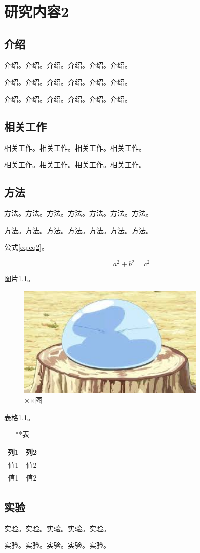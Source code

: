 \chapter{研究内容2}
\thispagestyle{mainstyle} %
\section{介绍}
介绍。介绍。介绍。介绍。介绍。介绍。

介绍。介绍。介绍。介绍。介绍。介绍。

介绍。介绍。介绍。介绍。介绍。介绍。

\section{相关工作}
相关工作。相关工作。相关工作。相关工作。

相关工作。相关工作。相关工作。相关工作。

\section{方法}
方法。方法。方法。方法。方法。方法。方法。

方法。方法。方法。方法。方法。方法。方法。

公式\ref{eq:eq2}。

\begin{equation}
    a^2 + b^2 = c^2 \label{eq:eq2}
\end{equation}

图片\ref{fig:image2}。
\begin{figure}
    \centering
    \includegraphics[width=0.8\textwidth]{images/image.jpeg}
    \caption{××图}
    \label{fig:image2}
\end{figure}

表格\ref{tab:table2}。
\begin{table}
    \centering
    \caption{**表}
    \label{tab:table2}
    \begin{tabular}{c|c}
        \toprule[1.5bp]
        列1 & 列2 \\
        \midrule[0.75bp]
        值1 & 值2 \\
        值1 & 值2 \\
        \bottomrule[1.5bp]
    \end{tabular}
\end{table}

\section{实验}
实验。实验。实验。实验。实验。

实验。实验。实验。实验。实验。